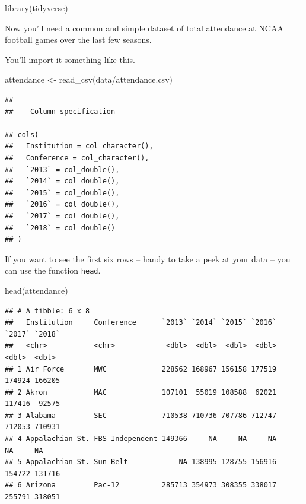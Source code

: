 \documentclass[
]{book}
\newenvironment{Shaded}{\begin{snugshade}}{\end{snugshade}}
\newcommand{\FunctionTok}[1]{\textcolor[rgb]{0.00,0.00,0.00}{#1}}
\newcommand{\NormalTok}[1]{#1}
\newcommand{\OtherTok}[1]{\textcolor[rgb]{0.56,0.35,0.01}{#1}}
\newcommand{\StringTok}[1]{\textcolor[rgb]{0.31,0.60,0.02}{#1}}
\begin{document}
\begin{Shaded}
\begin{Highlighting}[]
\FunctionTok{library}\NormalTok{(tidyverse)}
\end{Highlighting}
\end{Shaded}

Now you'll need a common and simple dataset of total attendance at NCAA football games over the last few seasons.

You'll import it something like this.

\begin{Shaded}
\begin{Highlighting}[]
\NormalTok{attendance }\OtherTok{\textless{}{-}} \FunctionTok{read\_csv}\NormalTok{(}\StringTok{\textquotesingle{}data/attendance.csv\textquotesingle{}}\NormalTok{)}
\end{Highlighting}
\end{Shaded}

\begin{verbatim}
## 
## -- Column specification --------------------------------------------------------
## cols(
##   Institution = col_character(),
##   Conference = col_character(),
##   `2013` = col_double(),
##   `2014` = col_double(),
##   `2015` = col_double(),
##   `2016` = col_double(),
##   `2017` = col_double(),
##   `2018` = col_double()
## )
\end{verbatim}

If you want to see the first six rows -- handy to take a peek at your data -- you can use the function \texttt{head}.

\begin{Shaded}
\begin{Highlighting}[]
\FunctionTok{head}\NormalTok{(attendance)}
\end{Highlighting}
\end{Shaded}

\begin{verbatim}
## # A tibble: 6 x 8
##   Institution     Conference      `2013` `2014` `2015` `2016` `2017` `2018`
##   <chr>           <chr>            <dbl>  <dbl>  <dbl>  <dbl>  <dbl>  <dbl>
## 1 Air Force       MWC             228562 168967 156158 177519 174924 166205
## 2 Akron           MAC             107101  55019 108588  62021 117416  92575
## 3 Alabama         SEC             710538 710736 707786 712747 712053 710931
## 4 Appalachian St. FBS Independent 149366     NA     NA     NA     NA     NA
## 5 Appalachian St. Sun Belt            NA 138995 128755 156916 154722 131716
## 6 Arizona         Pac-12          285713 354973 308355 338017 255791 318051
\end{verbatim}
\end{document}
